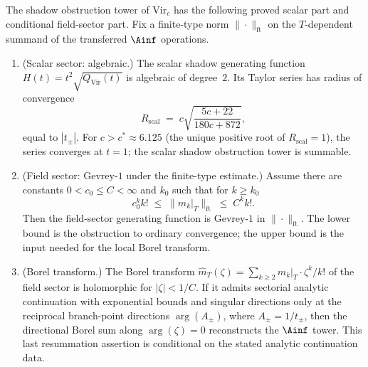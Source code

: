 \begin{theorem}
\label{thm:convergence-dichotomy}%
%
%
%
The shadow obstruction tower of \(\mathrm{Vir}_c\) has the following
proved scalar part and conditional field-sector part. Fix a finite-type
norm \(\|\cdot\|_{\mathrm{ft}}\) on the \(T\)-dependent summand of the
transferred \(\Ainf\) operations.
\begin{enumerate}[label=\textup{(\roman*)}]
\item \textup{(Scalar sector: algebraic.)}
 The scalar shadow generating function
 $H(t) = t^2\sqrt{Q_{\mathrm{Vir}}(t)}$ is algebraic of
 degree~$2$. Its Taylor series has radius of convergence
 \begin{equation}\label{eq:scalar-convergence-radius}
 R_{\mathrm{scal}}
 \;=\;
 c\sqrt{\frac{5c+22}{180c+872}},
 \end{equation}
 equal to $|t_\pm|$. For $c > c^* \approx 6.125$
 \textup{(}the unique positive root of
 $R_{\mathrm{scal}} = 1$\textup{)}, the series converges at
 $t = 1$; the scalar shadow obstruction tower is summable.
\item \textup{(Field sector: Gevrey-$1$ under the finite-type
estimate.)}
 Assume there are constants \(0<c_0\le C<\infty\) and \(k_0\) such
 that for \(k\ge k_0\)
 \begin{equation}\label{eq:field-gevrey}
 c_0^k k!
 \;\le\;
 \bigl\|m_k\big|_T\bigr\|_{\mathrm{ft}}
 \;\le\;
 C^k k!.
 \end{equation}
 Then the field-sector generating function is Gevrey-$1$ in
 \(\|\cdot\|_{\mathrm{ft}}\). The lower bound is the obstruction to
 ordinary convergence; the upper bound is the input needed for the
 local Borel transform.
\item \textup{(Borel transform.)}
 The Borel transform
 $\hat m_T(\zeta) = \sum_{k \ge 2} m_k|_T \cdot
 \zeta^k/k!$
 of the field sector is holomorphic for \(|\zeta|<1/C\). If it admits
 sectorial analytic continuation with
 exponential bounds and singular directions only at the reciprocal
 branch-point directions \(\arg(A_\pm)\), where
 \(A_\pm = 1/t_\pm\), then the directional Borel sum along
 \(\arg(\zeta)=0\) reconstructs the \(\Ainf\) tower. This last
 resummation assertion is conditional on the stated analytic
 continuation data.
\end{enumerate}
\end{theorem}

